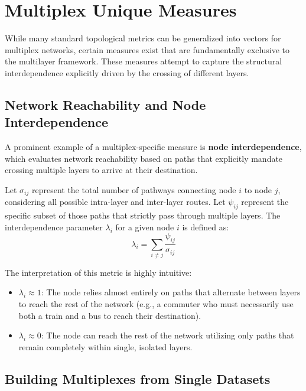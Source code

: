 \section{Multiplex Unique Measures}
\label{sec:multiplex_unique_measures}

While many standard topological metrics can be generalized into vectors for multiplex networks, certain measures exist that are fundamentally exclusive to the multilayer framework. These measures attempt to capture the structural interdependence explicitly driven by the crossing of different layers.

\subsection{Network Reachability and Node Interdependence}
\label{subsec:reachability_interdependence}

A prominent example of a multiplex-specific measure is \textbf{node interdependence}, which evaluates network reachability based on paths that explicitly mandate crossing multiple layers to arrive at their destination.

Let \(\sigma_{ij}\) represent the total number of pathways connecting node \(i\) to node \(j\), considering all possible intra-layer and inter-layer routes. Let \(\psi_{ij}\) represent the specific subset of those paths that strictly pass through multiple layers. The interdependence parameter \(\lambda_i\) for a given node \(i\) is defined as:
\[
    \lambda_i = \sum_{i \neq j} \frac{\psi_{ij}}{\sigma_{ij}}
\]

The interpretation of this metric is highly intuitive:
\begin{itemize}
    \item \(\lambda_i \approx 1\): The node relies almost entirely on paths that alternate between layers to reach the rest of the network (e.g., a commuter who must necessarily use both a train and a bus to reach their destination).
    \item \(\lambda_i \approx 0\): The node can reach the rest of the network utilizing only paths that remain completely within single, isolated layers.
\end{itemize}

\subsection{Building Multiplexes from Single Datasets}
\label{subsec:building_multiplexes_from_data}

